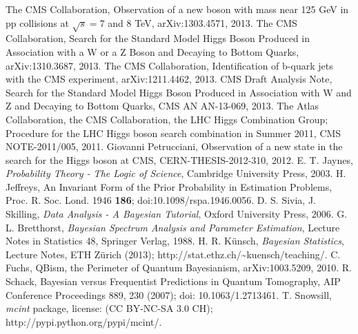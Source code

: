 \documentclass[aps,prb,twocolumn,showpacs,superscriptaddress,groupedaddress]{revtex4}  %
\begin{document}
\begin{thebibliography}{}
		The CMS Collaboration, Observation of a new boson with mass near 125 GeV in pp collisions at $\sqrt{s}=7$ and 8 TeV, arXiv:1303.4571, 2013.
		The CMS Collaboration, Search for the Standard Model Higgs Boson Produced in Association with a W or a Z Boson and Decaying to Bottom Quarks, arXiv:1310.3687, 2013.
		The CMS Collaboration, Identification of b-quark jets with the CMS experiment, arXiv:1211.4462, 2013.
		CMS Draft Analysis Note, Search for the Standard Model Higgs Boson Produced in Association with W and Z and Decaying to Bottom Quarks, CMS AN AN-13-069, 2013.
		The Atlas Collaboration, the CMS Collaboration, the LHC Higgs Combination Group; Procedure for the LHC Higgs boson search combination in Summer 2011, CMS NOTE-2011/005, 2011.
		Giovanni Petrucciani, Observation of a new state in the search for the Higgs boson at CMS, CERN-THESIS-2012-310, 2012.
		E. T. Jaynes, \emph{Probability Theory - The Logic of Science}, Cambridge University Press, 2003.
		H. Jeffreys, An Invariant Form of the Prior Probability in Estimation Problems, Proc. R. Soc. Lond. 1946 \textbf{186}; doi:10.1098/rspa.1946.0056.
		D. S. Sivia, J. Skilling, \emph{Data Analysis - A Bayesian Tutorial}, Oxford University Press, 2006.
		G. L. Bretthorst, \emph{Bayesian Spectrum Analysis and Parameter Estimation}, Lecture Notes in Statistics 48, Springer Verlag, 1988.
		H. R. K\"unsch, \emph{Bayesian Statistics}, Lecture Notes, ETH Z\"urich (2013); http://stat.ethz.ch/\textasciitilde{}kuensch/teaching/.
		C. Fuchs, QBism, the Perimeter of Quantum Bayesianism, arXiv:1003.5209, 2010.
		R. Schack, Bayesian versus Frequentist Predictions in Quantum Tomography, AIP Conference Proceedings 889, 230 (2007); doi: 10.1063/1.2713461.
		T. Snowsill, \emph{mcint} package,  license: (CC BY-NC-SA 3.0 CH); http://pypi.python.org/pypi/mcint/.
\end{thebibliography}
\end{document}
